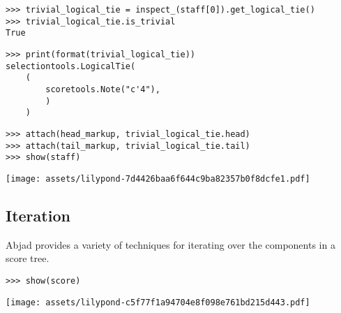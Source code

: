 \begin{comment}
<abjad>
trivial_logical_tie = inspect_(staff[0]).get_logical_tie()
trivial_logical_tie.is_trivial
print(format(trivial_logical_tie))
attach(head_markup, trivial_logical_tie.head)
attach(tail_markup, trivial_logical_tie.tail)
show(staff)
</abjad>
\end{comment}

\begin{abjadbookoutput}
\begin{singlespacing}
\vspace{-0.5\baselineskip}
\begin{lstlisting}
>>> trivial_logical_tie = inspect_(staff[0]).get_logical_tie()
>>> trivial_logical_tie.is_trivial
True
\end{lstlisting}
\begin{lstlisting}
>>> print(format(trivial_logical_tie))
selectiontools.LogicalTie(
    (
        scoretools.Note("c'4"),
        )
    )
\end{lstlisting}
\begin{lstlisting}
>>> attach(head_markup, trivial_logical_tie.head)
>>> attach(tail_markup, trivial_logical_tie.tail)
>>> show(staff)
\end{lstlisting}
\noindent\texttt{[image: assets/lilypond-7d4426baa6f644c9ba82357b0f8dcfe1.pdf]}
\end{singlespacing}
\end{abjadbookoutput}

\noindent

\subsection{Iteration}
\label{ssec:iteration}

Abjad provides a variety of techniques for iterating over the components in a
score tree.

\begin{comment}
<abjad>
show(score)
</abjad>
\end{comment}

\begin{abjadbookoutput}
\begin{singlespacing}
\vspace{-0.5\baselineskip}
\begin{lstlisting}
>>> show(score)
\end{lstlisting}
\noindent\texttt{[image: assets/lilypond-c5f77f1a94704e8f098e761bd215d443.pdf]}
\end{singlespacing}
\end{abjadbookoutput}


